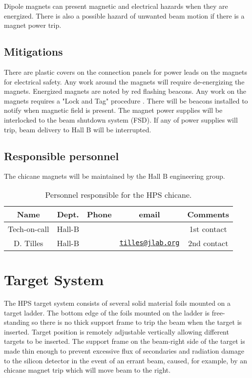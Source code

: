 \documentclass[11pt]{report}
\begin{document}
Dipole magnets can present magnetic and electrical hazards when they are energized. There is also a possible hazard of unwanted beam motion if there is a magnet power trip.  


\subsection{Mitigations}
\indent

There are plastic covers on the connection panels for power leads on the magnets for electrical safety. Any work around the magnets will require de-energizing the magnets. Energized magnets are noted by red flashing beacons. Any work on the magnets requires a "Lock and Tag" procedure \cite{ehs}. There will be beacons installed to notify when magnetic field is present. The magnet power supplies will be interlocked to the beam shutdown system (FSD). If any of power supplies will trip, beam delivery to Hall B will be interrupted.

\subsection{Responsible personnel}

The chicane magnets will be maintained by the Hall B engineering group.  

 \begin{table}[!ht]
 \centering
 \begin{tabular}{|c|c|c|c|c|}
\hline
 Name&Dept.&Phone&email&Comments \\ \hline
 Tech-on-call & Hall-B&&& 1st contact  \\ \hline
 D. Tilles & Hall-B&&\href{mailto:tilles@jlab.org}{\nolinkurl{tilles@jlab.org}}&2nd contact \\ \hline
  \end{tabular}
\caption{Personnel responsible for the HPS chicane.} 
\label{tb:magnets}
\end{table}


\section{Target System}

\indent

The HPS target system consists of several solid material foils mounted on a target ladder. The bottom edge of the foils mounted on the ladder is free-standing so there
is no thick support frame to trip the beam when the target is inserted. Target position is remotely  adjustable vertically allowing different targets to be inserted. The support
frame on the beam-right side of the target is made thin enough to
prevent excessive flux of secondaries and radiation damage to the silicon detector in the event of an errant
beam,  caused, for example, by an chicane magnet trip which will move beam to the right.
               
\end{document}
